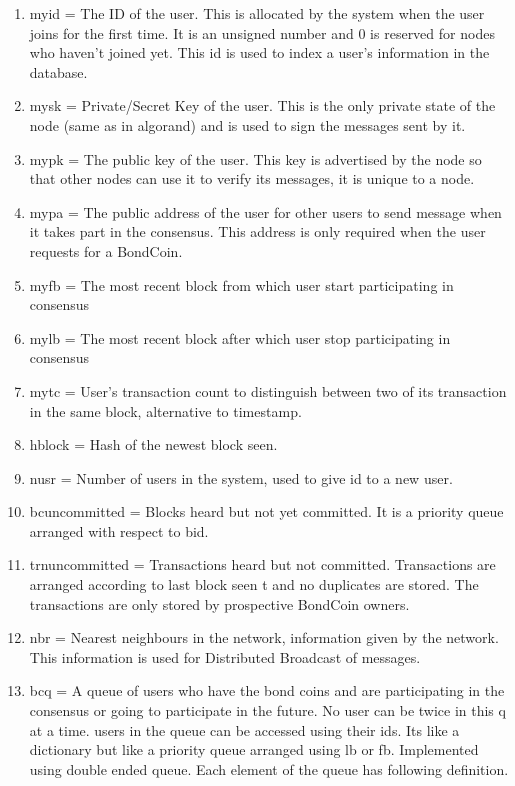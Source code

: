 {
\singlespacing
\begin{enumerate}
    \item myid = The ID of the user. This is allocated by the system when the user joins for the first time. It is an unsigned number and 0 is reserved for nodes who haven't joined yet. This id is used to index a user's information in the database.
	\item mysk = Private/Secret Key of the user. This is the only private state of the node (same as in algorand) and is used to sign the messages sent by it.
	\item mypk = The public key of the user. This key is advertised by the node so that other nodes can use it to verify its messages, it is unique to a node.
	\item mypa = The public address of the user for other users to send message when it takes part in the consensus. This address is only required when the user requests for a BondCoin.
	\item myfb = The most recent block from which user start participating in consensus
	\item mylb = The most recent block after which user stop participating in consensus
	\item mytc = User's transaction count to distinguish between two of its transaction in the same block, alternative to timestamp.
	\item hblock = Hash of the newest block seen.
	\item nusr = Number of users in the system, used to give id to a new user.
	\item bcuncommitted = Blocks heard but not yet committed. It is a priority queue arranged with respect to bid.
	\item trnuncommitted = Transactions heard but not committed. Transactions are arranged according to last block seen t and no duplicates are stored. The transactions are only stored by prospective BondCoin owners.
	\item nbr = Nearest neighbours in the network, information given by the network. This information is used for Distributed Broadcast of messages.
	\item bcq = A queue of users who have the bond coins and are participating in the consensus or going to participate in the future. No user can be twice in this q at a time. users in the queue can be accessed using their ids. Its like a dictionary but like a priority queue arranged using lb or fb. Implemented using double ended queue.
    Each element of the queue has following definition.

\end{enumerate}}
